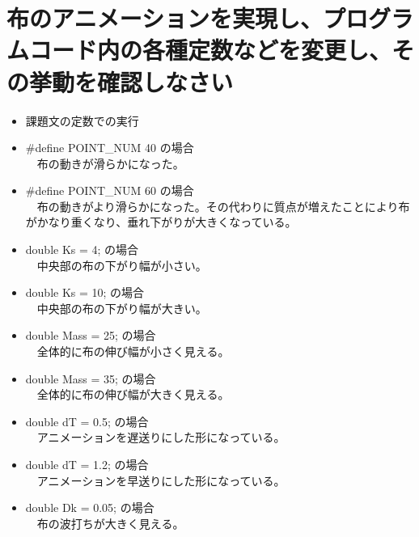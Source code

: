\documentclass{scrartcl}
\begin{document}
\section{布のアニメーションを実現し、プログラムコード内の各種定数などを変更し、その挙動を確認しなさい}
\label{sec:org066abee}
\begin{itemize}
\item 課題文の定数での実行\\

\item \#define POINT\_NUM 40 の場合\\
　布の動きが滑らかになった。\\

\item \#define POINT\_NUM 60 の場合\\
　布の動きがより滑らかになった。その代わりに質点が増えたことにより布がかなり重くなり、垂れ下がりが大きくなっている。\\

\item double Ks = 4; の場合\\
　中央部の布の下がり幅が小さい。\\

\item double Ks = 10; の場合\\
　中央部の布の下がり幅が大きい。\\

\item double Mass = 25; の場合\\
　全体的に布の伸び幅が小さく見える。\\

\item double Mass = 35; の場合\\
　全体的に布の伸び幅が大きく見える。\\

\item double dT = 0.5; の場合\\
　アニメーションを遅送りにした形になっている。\\

\item double dT = 1.2; の場合\\
　アニメーションを早送りにした形になっている。\\

\item double Dk = 0.05; の場合\\
　布の波打ちが大きく見える。\\


\end{itemize}
\end{document}
